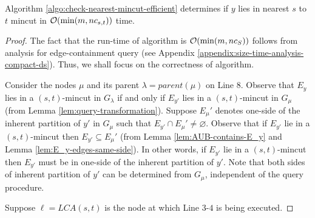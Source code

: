\begin{lemma}
Algorithm \ref{algo:check-nearest-mincut-efficient} determines if $y$ lies in nearest $s$ to $t$ mincut in ${\cal O}(\min(m,nc_{s,t}))$ time.
\end{lemma}
\begin{proof}
The fact that the run-time of algorithm is ${\cal O}(\min(m,nc_S))$ follows from analysis for edge-containment query (see Appendix \ref{appendix:size-time-analysis-compact-ds}). Thus, we shall focus on the correctness of algorithm.

Consider the nodes $\mu$ and its parent $\lambda = parent(\mu)$ on Line $8$. Observe that $E_y$ lies in a $(s,t)$-mincut in $G_\lambda$ if and only if $E_{y'}$ lies in a $(s,t)$-mincut in $G_\mu$ (from Lemma \ref{lem:query-transformation}). Suppose $E_\mu'$ denotes one-side of the inherent partition of $y'$ in $G_\mu$ such that $E_{y'}\cap E_\mu' \neq \varnothing$. Observe that if $E_{y'}$ lie in a $(s,t)$-mincut then $E_{y'} \subseteq E_\mu'$ (from Lemma \ref{lem:AUB-contains-E_y} and Lemma \ref{lem:E_y-edges-same-side}). In other words, if $E_{y'}$ lie in a $(s,t)$-mincut then $E_{y'}$ must be in one-side of the inherent partition of $y'$. Note that both sides of inherent partition of $y'$ can be determined from $G_\mu$, independent of the query procedure.

Suppose $\ell = LCA(s,t)$ is the node at which Line $3$-$4$ is being executed.


\end{proof}
